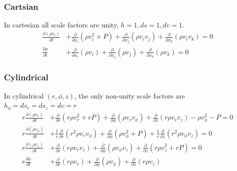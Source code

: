 \documentclass{article}
\newcommand{\pderiv}[1]{\frac{\partial }{\partial #1}}
\newcommand{\ppderiv}[2]{\frac{\partial #1}{\partial #2}}
\begin{document}
\subsubsection{Cartsian}
In cartesian all scale factors are unity, $h = 1, ds = 1, dv=1$.
\begin{align}
\ppderiv{(\rho v_i)}{t} &+ \pderiv{x_i} \left(\rho v_i^2 + P \right) +  \pderiv{x_j} \left( \rho v_i v_j \right) + \pderiv{x_k} \left( \rho v_i v_k \right)  = 0 \\ 
 \ppderiv{\rho}{t} &+ \pderiv{x_i} \left( \rho v_i \right) +\pderiv{x_j} \left( \rho v_j \right) +\pderiv{x_k} \left( \rho v_k \right)  = 0
 \end{align}
\subsubsection{Cylindrical}
In cylindrical $(r,\phi,z)$, the only non-unity scale factors are $h_\phi = ds_r = ds_z = dv = r$
\begin{align}
r \ppderiv{(\rho v_r)}{t} &+ \pderiv{r} \left( r \rho v_r^2 + r P \right)  + \pderiv{\phi} \left(  \rho v_r v_\phi \right) + \pderiv{z} \left(r  \rho v_r v_z \right)  - \rho v_\phi^2 - P = 0 \\
r \ppderiv{(\rho v_\phi)}{t} &+ \frac{1}{r} \pderiv{r} \left( r^2 \rho v_r v_\phi \right) + \pderiv{\phi} \left(  \rho v_\phi^2 + P \right) + \frac{1}{r} \pderiv{z} \left(r^2 \rho v_\phi v_z \right)  = 0 \\
r \ppderiv{(\rho v_z)}{t} &+ \pderiv{r} \left( r \rho v_r v_z \right) + \pderiv{\phi} \left( \rho v_\phi v_z \right) + \pderiv{z} \left( r \rho v_z^2 + r P \right) = 0 \\
r \ppderiv{\rho}{t} &+ \pderiv{r} \left( r \rho v_r \right) + \pderiv{\phi} \left(\rho v_\phi \right) + \pderiv{z} \left(r  \rho v_z \right)  
\end{align}
\end{document}
